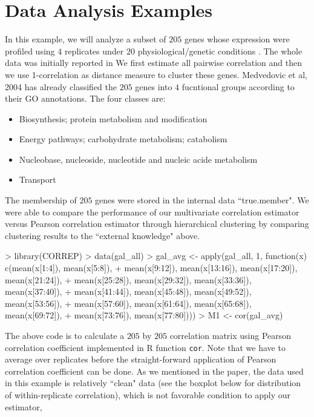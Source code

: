 \documentclass[a4paper]{article}
\begin{document}
\section{Data Analysis Examples}
In this example, we will analyze a subset of $205$ genes whose expression were 
profiled using $4$ replicates under $20$ physiological/genetic conditions \cite{Medvedovic04}.
The whole data was initially reported in \cite{Ideker00} 
We first estimate all pairwise correlation and then we use 1-correlation as distance
measure to cluster these genes. Medvedovic et al, 2004 \cite{Medvedovic04} has 
already classified the $205$ genes into $4$ fucntional groups according to their 
GO annotations. The four classes are: 
\begin{itemize}
\item Biosynthesis; protein metabolism and modification
\item	Energy pathways; carbohydrate metabolism; catabolism
\item	Nucleobase, nucleoside, nucleotide and nucleic acide metabolism
\item	Transport
\end{itemize}
The membership of $205$ genes were stored in the internal data ``true.member". 
We were able to compare the performance of our multivariate correlation estimator 
versus Pearson correlation estimator through hierarchical clustering by comparing 
clustering results to the ``external knowledge" above. 
\begin{Schunk}
\begin{Sinput}
> library(CORREP)
> data(gal_all)
> gal_avg <- apply(gal_all, 1, function(x) c(mean(x[1:4]), mean(x[5:8]), 
+     mean(x[9:12]), mean(x[13:16]), mean(x[17:20]), mean(x[21:24]), 
+     mean(x[25:28]), mean(x[29:32]), mean(x[33:36]), mean(x[37:40]), 
+     mean(x[41:44]), mean(x[45:48]), mean(x[49:52]), mean(x[53:56]), 
+     mean(x[57:60]), mean(x[61:64]), mean(x[65:68]), mean(x[69:72]), 
+     mean(x[73:76]), mean(x[77:80])))
> M1 <- cor(gal_avg)
\end{Sinput}
\end{Schunk}
The above code is to calculate a $205$ by $205$ correlation matrix using Pearson
correlation coefficient implemented in R function \texttt{cor}. Note that we have to 
average over replicates before the straight-forward application of Pearson correlation
coefficient can be done. As we mentioned in the paper, the data used in this example
is relatively ``clean" data (see the boxplot below for distribution of within-replicate
correlation), which is not favorable condition to apply our estimator,
\end{document}
